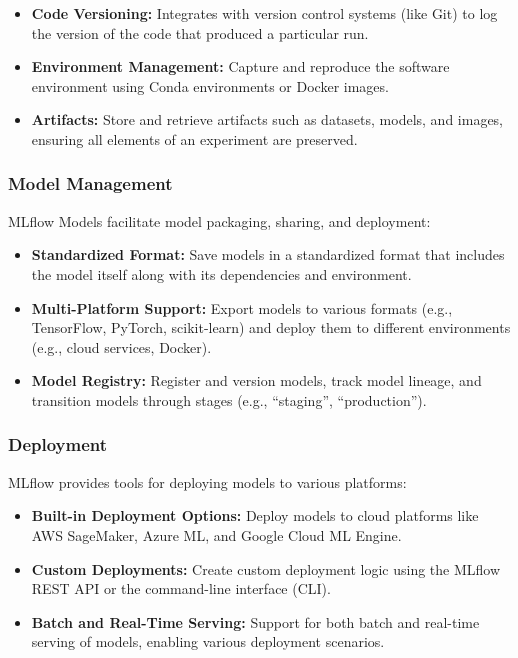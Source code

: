 \documentclass[letterpaper,12pt,notitlepage,twoside]{report}
\begin{document}
\begin{itemize}
    \item \textbf{Code Versioning:} Integrates with version control systems (like Git) to log the version of the code that produced a particular run.
    \item \textbf{Environment Management:} Capture and reproduce the software environment using Conda environments or Docker images.
    \item \textbf{Artifacts:} Store and retrieve artifacts such as datasets, models, and images, ensuring all elements of an experiment are preserved.
\end{itemize}

\subsubsection{Model Management}
MLflow Models facilitate model packaging, sharing, and deployment:

\begin{itemize}
    \item \textbf{Standardized Format:} Save models in a standardized format that includes the model itself along with its dependencies and environment.
    \item \textbf{Multi-Platform Support:} Export models to various formats (e.g., TensorFlow, PyTorch, scikit-learn) and deploy them to different environments (e.g., cloud services, Docker).
    \item \textbf{Model Registry:} Register and version models, track model lineage, and transition models through stages (e.g., ``staging'', ``production'').
\end{itemize}

\subsubsection{Deployment}
MLflow provides tools for deploying models to various platforms:

\begin{itemize}
    \item \textbf{Built-in Deployment Options:} Deploy models to cloud platforms like AWS SageMaker, Azure ML, and Google Cloud ML Engine.
    \item \textbf{Custom Deployments:} Create custom deployment logic using the MLflow REST API or the command-line interface (CLI).
    \item \textbf{Batch and Real-Time Serving:} Support for both batch and real-time serving of models, enabling various deployment scenarios.
\end{itemize}
\end{document}
